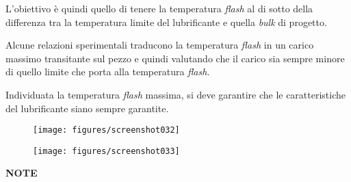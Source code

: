 \documentclass[a4paper, 15pt]{article}
\begin{document}
\begin{adjustwidth}{2in}{}
	L'obiettivo è quindi quello di tenere la temperatura \textit{flash} al di sotto della differenza tra la temperatura limite del lubrificante e quella \textit{bulk} di progetto. \newline 
	
	Alcune relazioni sperimentali traducono la temperatura \textit{flash} in un carico massimo transitante sul pezzo e quindi valutando che il carico sia sempre minore di quello limite che porta alla temperatura \textit{flash}.
	
	Individuata la temperatura \textit{flash} massima, si deve garantire che le caratteristiche del lubrificante siano sempre garantite. 
	\begin{figure}[H]
		\parbox{0.45\textwidth}{\centering
		\texttt{[image: figures/screenshot032]}
		\label{fig:screenshot032}}
		\parbox{0.45\textwidth}{\centering
		\texttt{[image: figures/screenshot033]}
		\label{fig:screenshot033}}
	\end{figure}
	
		
		
		





































\newpage
\textbf{{\LARGE NOTE}}

%		
\end{adjustwidth}
\end{document}
